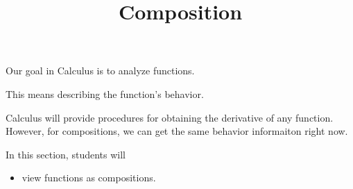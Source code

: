 \documentclass{ximera}
\title{Composition}
\begin{document}
\begin{abstract}
%
\end{abstract}
\maketitle





Our goal in Calculus is to analyze functions.


This means describing the function's behavior.

Calculus will provide procedures for obtaining the derivative of any function.  However, for compositions, we can get the same behavior informaiton right now.



\begin{sectionOutcomes}
In this section, students will 

\begin{itemize}
\item view functions as compositions.
\end{itemize}
\end{sectionOutcomes}
\end{document}
